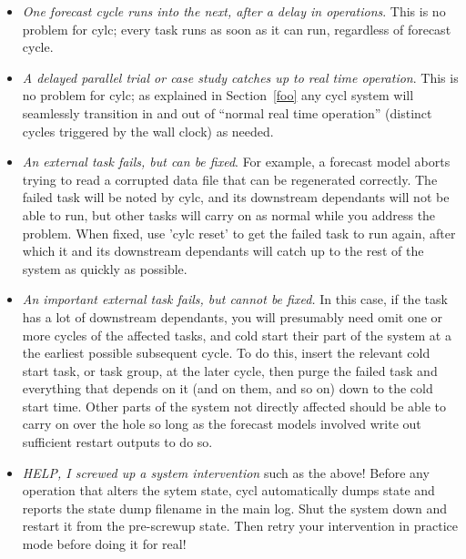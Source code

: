 \documentclass[11pt,a4paper]{article}
\begin{document}
\begin{itemize}
    \item {\em One forecast cycle runs into the next, after a delay in
        operations}. This is no problem for cylc; every task runs as
        soon as it can run, regardless of forecast cycle.

    \item {\em A delayed parallel trial or case study catches up to real
        time operation}. This is no problem for cylc; as explained in
        Section~\ref{foo} any cycl system will seamlessly transition in
        and out of ``normal real time operation'' (distinct cycles
        triggered by the wall clock) as needed.

    \item {\em An external task fails, but can be fixed}. For example, a
        forecast model aborts trying to read a corrupted data file that
        can be regenerated correctly. The failed task will be noted by
        cylc, and its downstream dependants will not be able to run,
        but other tasks will carry on as normal while you address the
        problem. When fixed, use 'cylc reset' to get the failed task to
        run again, after which it and its downstream dependants will
        catch up to the rest of the system as quickly as possible.

    \item {\em An important external task fails, but cannot be fixed.}
        In this case, if the task has a lot of downstream dependants,
        you will presumably need omit one or more cycles of the affected
        tasks, and cold start their part of the system at a the earliest
        possible subsequent cycle.  To do this, insert the relevant cold
        start task, or task group, at the later cycle, then purge the
        failed task and everything that depends on it (and on them, and
        so on) down to the cold start time.  Other parts of the system 
        not directly affected should be able to carry on over the hole
        so long as the forecast models involved write out sufficient 
        restart outputs to do so.

    \item {\em HELP, I screwed up a system intervention} such as the
        above!  Before any operation that alters the sytem state, cycl
        automatically dumps state and reports the state dump filename in
        the main log.  Shut the system down and restart it from the
        pre-screwup state. Then retry your intervention in practice mode
        before doing it for real!

\end{itemize}
\end{document}
